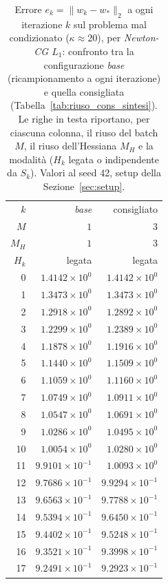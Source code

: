 \begin{table}[H]
\centering
\footnotesize
\renewcommand{\arraystretch}{0.85}
\setlength{\tabcolsep}{8pt}
\caption{Errore $e_k=\|w_k-w_*\|_2$ a ogni iterazione $k$ sul problema mal condizionato ($\kappa\approx 20$), per \emph{Newton-CG $L_1$}: confronto tra la configurazione \emph{base} (ricampionamento a ogni iterazione) e quella consigliata (Tabella~\ref{tab:riuso_cons_sintesi}). Le righe in testa riportano, per ciascuna colonna, il riuso del batch $M$, il riuso dell'Hessiana $M_H$ e la modalità ($H_k$ legata o indipendente da $S_k$). Valori al seed 42, setup della Sezione~\ref{sec:setup}.}
\label{tab:riuso_cons_malcond_nl1}
\begin{tabular}{@{}rrr@{}}
\toprule
$k$ & \emph{base} & consigliato\\
$M$ & $1$ & $3$\\
$M_H$ & $1$ & $3$\\
$H_k$ & legata & legata\\
\midrule
0 & $1.4142\times10^{0}$ & $1.4142\times10^{0}$\\
1 & $1.3473\times10^{0}$ & $1.3473\times10^{0}$\\
2 & $1.2918\times10^{0}$ & $1.2892\times10^{0}$\\
3 & $1.2299\times10^{0}$ & $1.2389\times10^{0}$\\
4 & $1.1878\times10^{0}$ & $1.1916\times10^{0}$\\
5 & $1.1440\times10^{0}$ & $1.1509\times10^{0}$\\
6 & $1.1059\times10^{0}$ & $1.1160\times10^{0}$\\
7 & $1.0749\times10^{0}$ & $1.0911\times10^{0}$\\
8 & $1.0547\times10^{0}$ & $1.0691\times10^{0}$\\
9 & $1.0286\times10^{0}$ & $1.0495\times10^{0}$\\
10 & $1.0054\times10^{0}$ & $1.0280\times10^{0}$\\
11 & $9.9101\times10^{-1}$ & $1.0093\times10^{0}$\\
12 & $9.7686\times10^{-1}$ & $9.9294\times10^{-1}$\\
13 & $9.6563\times10^{-1}$ & $9.7788\times10^{-1}$\\
14 & $9.5394\times10^{-1}$ & $9.6450\times10^{-1}$\\
15 & $9.4402\times10^{-1}$ & $9.5248\times10^{-1}$\\
16 & $9.3521\times10^{-1}$ & $9.3998\times10^{-1}$\\
17 & $9.2491\times10^{-1}$ & $9.2923\times10^{-1}$\\

\end{tabular}
\end{table}
